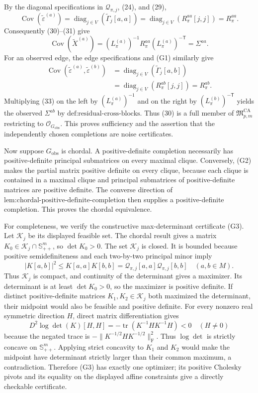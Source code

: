 By the diagonal specifications in \(\mathcal Q_{\pi,j}\), (24), and (29),
\[
\operatorname{Cov}(\widetilde\varepsilon^{(a)})
=\operatorname{diag}_{j\in V}(\widetilde\Gamma_j[a,a])
=\operatorname{diag}_{j\in V}(R_\pi^{aa}[j,j])
=R_\pi^{aa}.
\tag{31}
\]
Consequently (30)--(31) give
\[
\operatorname{Cov}(\widetilde X^{(a)})
=(L_\pi^{(a)})^{-1}R_\pi^{aa}(L_\pi^{(a)})^{-\mathsf T}
=\Sigma^{aa}.
\tag{32}
\]
For an observed edge, the edge specifications and (G1) similarly give
\[
\begin{aligned}
\operatorname{Cov}(\widetilde\varepsilon^{(a)},\widetilde\varepsilon^{(b)})
&=\operatorname{diag}_{j\in V}(\widetilde\Gamma_j[a,b])\\
&=\operatorname{diag}_{j\in V}(R_\pi^{ab}[j,j])
=R_\pi^{ab}.
\end{aligned}
\tag{33}
\]
Multiplying (33) on the left by \((L_\pi^{(a)})^{-1}\) and on the right by \((L_\pi^{(b)})^{-\mathsf T}\) yields the observed \(\Sigma^{ab}\) by \(\text{def:residual-cross-blocks}\).  Thus (30) is a full member of \(\mathfrak M_{p,m}^{\mathrm{CA}}\) restricting to \(\mathcal O_{G_{\mathrm{obs}}}\).  This proves sufficiency and the assertion that the independently chosen completions are noise certificates.

Now suppose \(G_{\mathrm{obs}}\) is chordal.  A positive-definite completion necessarily has positive-definite principal submatrices on every maximal clique.  Conversely, (G2) makes the partial matrix positive definite on every clique, because each clique is contained in a maximal clique and principal submatrices of positive-definite matrices are positive definite.  The converse direction of \(\text{lem:chordal-positive-definite-completion}\) then supplies a positive-definite completion.  This proves the chordal equivalence.

For completeness, we verify the constructive max-determinant certificate (G3).  Let \(\mathcal K_j\) be its displayed feasible set.  The chordal result gives a matrix \(K_0\in\mathcal K_j\cap\mathbb S_{++}^m\), so \(\det K_0>0\).  The set \(\mathcal K_j\) is closed.  It is bounded because positive semidefiniteness and each two-by-two principal minor imply
\[
|K[a,b]|^2\le K[a,a]K[b,b]
=\mathcal Q_{\pi,j}[a,a]\mathcal Q_{\pi,j}[b,b]
\quad(a,b\in M).
\tag{34}
\]
Thus \(\mathcal K_j\) is compact, and continuity of the determinant gives a maximizer.  Its determinant is at least \(\det K_0>0\), so the maximizer is positive definite.  If distinct positive-definite matrices \(K_1,K_2\in\mathcal K_j\) both maximized the determinant, their midpoint would also be feasible and positive definite.  For every nonzero real symmetric direction \(H\), direct matrix differentiation gives
\[
D^2\log\det(K)[H,H]
=-\operatorname{tr}(K^{-1}HK^{-1}H)<0
\quad(H\ne0)
\tag{35}
\]
because the negated trace is \(-\|K^{-1/2}HK^{-1/2}\|_{\mathrm F}^2\).  Thus \(\log\det\) is strictly concave on \(\mathbb S_{++}^m\).  Applying strict concavity to \(K_1\) and \(K_2\) would make the midpoint have determinant strictly larger than their common maximum, a contradiction.  Therefore (G3) has exactly one optimizer; its positive Cholesky pivots and its equality on the displayed affine constraints give a directly checkable certificate.


